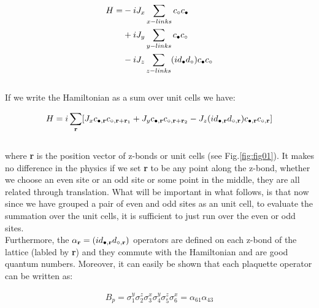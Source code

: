 \documentclass{article}
\begin{document}
\begin{equation}\label{eq:8}
	\begin{aligned}
		H= &-iJ_x \sum_{x-links} c_{\circ}c_{\color{black}\bullet}\\
		&+iJ_y \sum_{y-links} c_{\color{black}\bullet}c_{\circ}\\
		&-iJ_z \sum_{z-links} (id_{\color{black}\bullet}d_{\circ})c_{\color{black}\bullet}c_{\circ}\\ 
	\end{aligned}
\end{equation}\\

\noindent If we write the Hamiltonian as a sum over unit cells we have:

\begin{equation}\label{eq:9}
	\begin{aligned}
		H= i\sum_{\textbf{r}}[J_x c_{\color{black}\bullet,\textbf{r}}c_{\circ,\textbf{r}+\textbf{r}_1} + J_y c_{\color{black}\bullet,\textbf{r}}c_{\circ,\textbf{r}+\textbf{r}_2} - J_z (id_{\color{black}\bullet,\textbf{r}}d_{\circ,\textbf{r}})c_{\color{black}\bullet,\textbf{r}}c_{\circ,\textbf{r}}]\\ 
	\end{aligned}
\end{equation}\\

\noindent where \textbf{r} is the position vector of z-bonds or unit cells  (see Fig.\hspace{0.2mm}\ref{fig:fig01}). It makes no difference in the physics if we set \textbf{r} to be any point along the z-bond, whether we choose an even site or an odd site or some point in the middle, they are all related through translation. 
What will be important in what follows, is that now since we have grouped a pair of even and odd sites as an unit cell, to evaluate the summation over the unit cells, it is sufficient to just run over the even or odd sites.\\
Furthermore, the $\alpha_\textbf{r} = (id_{\color{black}\bullet,\textbf{r}}d_{\circ,\textbf{r}})$ operators are defined on each z-bond of the lattice (labled by \textbf{r}) and they commute with the Hamiltonian and are good quantum numbers.
Moreover, it can easily be shown that each plaquette operator can be written as:

\begin{equation}\label{eq:10}
	\begin{aligned}
		B_p = \sigma^y_1\sigma^z_2\sigma^x_3\sigma^y_4\sigma^z_5\sigma^x_6 = \alpha_{61}\alpha_{43}\\
	\end{aligned}
\end{equation}
\end{document}

